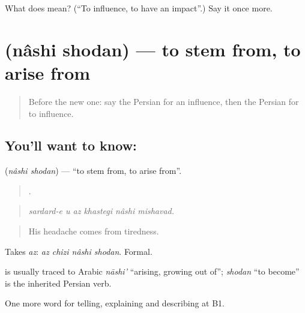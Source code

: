 \begin{tcolorbox}[breakable,colback=teal!4,colframe=teal!35!black,title={Before you move on}]
What does   mean? (\textquotedblleft{}To influence, to have an impact\textquotedblright{}.) Say it once more.
\end{tcolorbox}
\section[\texorpdfstring{\fa{ناشی} \fa{شدن} (nâshi shodan)}{ناشی شدن (nâshi shodan)}]{  (nâshi shodan) — to stem from, to arise from}

\label{lesson:FA-C372-nashi-shodan}



\begin{quote}
Before the new one: say the Persian for an influence, then the Persian for to influence.
\end{quote}

\subsection*{You'll want to know:  }
\textbf{ } (\emph{nâshi shodan}) — \textquotedblleft{}to stem from, to arise from\textquotedblright{}.

\begin{quote}
     .
\end{quote}

\begin{quote}
\emph{sardard-e u az khastegi nâshi mishavad.}
\end{quote}

\begin{quote}
His headache comes from tiredness.
\end{quote}

Takes \emph{az}: \emph{az chizi nâshi shodan}. Formal.

\begin{cousinweb}
\textbf{} is usually traced to Arabic \emph{nāshi'} \textquotedblleft{}arising, growing out of\textquotedblright{}; \emph{shodan} \textquotedblleft{}to become\textquotedblright{} is the inherited Persian verb.
\end{cousinweb}

\begin{grammarlens}[title={What you've built}]
One more word for telling, explaining and describing at B1.
\end{grammarlens}

